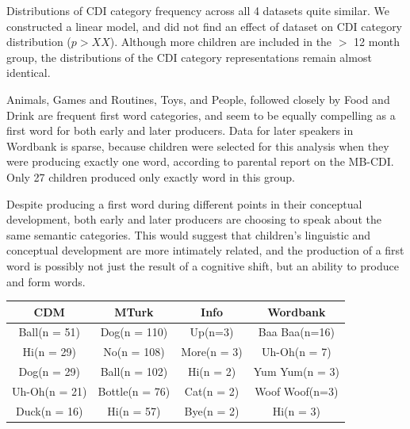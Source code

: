 \documentclass[10pt,letterpaper]{article}
\begin{document}
Distributions of CDI category frequency across all 4 datasets quite similar. We constructed a linear model, and did not find an effect of dataset on CDI category distribution ($p > XX$). Although more children are included in the $>$ 12 month group, the distributions of the CDI category representations remain almost identical.

Animals, Games and Routines, Toys, and People, followed closely by Food and Drink are frequent first word categories, and seem to be equally compelling as a first word for both early and later producers. Data for later speakers in Wordbank is sparse, because children were selected for this analysis when they were producing exactly one word, according to parental report on the MB-CDI. Only 27 children produced only exactly word in this group.

Despite producing a first word during different points in their conceptual development, both early and later producers are choosing to speak about the same semantic categories. This would suggest that children's linguistic and conceptual development are more intimately related, and the production of a first word is possibly not just the result of a cognitive shift, but an ability to produce and form words.




{\centering
\begin{tabular}{ | c | c | c | c | }
 \hline
    CDM & MTurk & Info & Wordbank \\ \hline
    Ball\newline(n = 51) & Dog\newline(n = 110) & Up\newline(n=3) & Baa Baa\newline(n=16) \\ \hline
    Hi\newline(n = 29) & No\newline(n = 108) & More\newline(n = 3) & Uh-Oh\newline(n = 7) \\ \hline
    Dog\newline(n = 29) & Ball\newline(n = 102) & Hi\newline(n = 2) & Yum Yum\newline(n = 3) \\ \hline
    Uh-Oh\newline(n = 21) & Bottle\newline(n = 76) & Cat\newline(n = 2) & Woof Woof\newline(n=3) \\ \hline
    Duck\newline(n = 16) & Hi\newline(n = 57) & Bye\newline(n = 2) & Hi\newline(n = 3) \\ \hline		
 \end{tabular}
}
\end{document}
